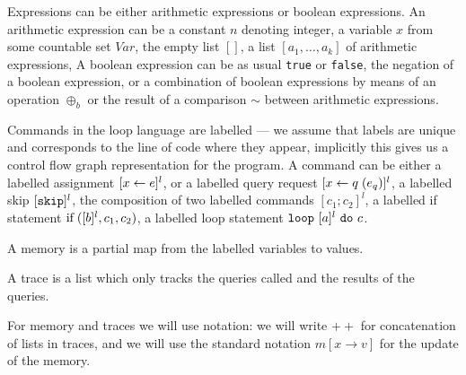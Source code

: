 Expressions can be either arithmetic expressions or boolean expressions. 
An arithmetic expression can be a  constant $n$ denoting integer, a variable $x$ from some countable set $Var$, the empty list $[]$, a list $[a_1,\ldots,a_k]$ of arithmetic expressions, 
%
A boolean expression can be as usual {\tt true} or {\tt false}, the negation of
a boolean expression, or a combination of boolean expressions by means of an operation $\oplus_b$ or the result of a comparison $\sim$ between arithmetic expressions. 
% 

%
Commands in the loop language are labelled  --- we assume that labels are unique and corresponds to the line of code where they appear, implicitly this gives us a control flow graph representation for the program. 
A command can be either a labelled assignment $[\mathrel{ x \leftarrow e }]^{l}$, or a labelled query request  $[\mathrel{ x \leftarrow q }(e_q)]^{l}$, a labelled skip $[\mathtt{skip}]^{l}$, the composition of two labelled commands $[c_1;c_2]^l$, a labelled if statement $\mbox{if\;}([b]^{l}, c_1, c_2)$, a labelled loop statement  $\mathtt{loop} ~ [a]^{l}~ \mathtt{do} ~ c $.

A memory is a partial map from the labelled variables to values.

A trace is a list which only tracks the queries called and the results of the queries.   

For memory and traces we will use notation: we will write $++$ for concatenation of lists in traces, and we will use the standard notation $m[x \to v ]$ for the update of the memory.



